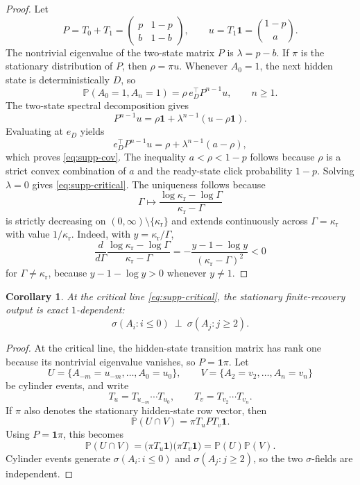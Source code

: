\documentclass[11pt]{amsart}
\numberwithin{equation}{section}
\newtheorem{corollary}[proposition]{Corollary}
\theoremstyle{remark}
\newcommand{\PP}{\mathbb{P}}
\begin{document}
\begin{proof}
Let
\[
P=T_0+T_1=
\begin{pmatrix}
 p & 1-p\\
 b & 1-b
\end{pmatrix},
\qquad
u=T_1\mathbf 1=\binom{1-p}{a}.
\]
The nontrivial eigenvalue of the two-state matrix $P$ is $\lambda=p-b$. If $\pi$ is the stationary distribution of $P$, then $\rho=\pi u$. Whenever $A_0=1$, the next hidden state is deterministically $D$, so
\[
\PP(A_0=1,A_n=1)=\rho\, e_D^\top P^{n-1}u,\qquad n\ge1.
\]
The two-state spectral decomposition gives
\[
P^{n-1}u=\rho\mathbf 1+\lambda^{n-1}(u-\rho\mathbf 1).
\]
Evaluating at $e_D$ yields
\[
e_D^\top P^{n-1}u=\rho+\lambda^{n-1}(a-\rho),
\]
which proves \cref{eq:supp-cov}. The inequality $a<\rho<1-p$ follows because $\rho$ is a strict convex combination of $a$ and the ready-state click probability $1-p$. Solving $\lambda=0$ gives \cref{eq:supp-critical}. The uniqueness follows because
\[
\Gamma\longmapsto \frac{\log\kappa_{\mathrm r}-\log\Gamma}{\kappa_{\mathrm r}-\Gamma}
\]
is strictly decreasing on $(0,\infty)\setminus\{\kappa_{\mathrm r}\}$ and extends continuously across $\Gamma=\kappa_{\mathrm r}$ with value $1/\kappa_{\mathrm r}$. Indeed, with $y=\kappa_{\mathrm r}/\Gamma$,
\[
\frac{d}{d\Gamma}
\frac{\log\kappa_{\mathrm r}-\log\Gamma}{\kappa_{\mathrm r}-\Gamma}
=
-\frac{y-1-\log y}{(\kappa_{\mathrm r}-\Gamma)^2}<0
\]
for $\Gamma\neq\kappa_{\mathrm r}$, because $y-1-\log y>0$ whenever $y\neq1$.
\end{proof}

\begin{corollary}\label{cor:supp-1dep}
At the critical line \cref{eq:supp-critical}, the stationary finite-recovery output is exact $1$-dependent:
\[
\sigma(A_i:i\le0)\ \perp\ \sigma(A_j:j\ge2).
\]
\end{corollary}

\begin{proof}
At the critical line, the hidden-state transition matrix has rank one because its nontrivial eigenvalue vanishes, so $P=\mathbf 1\pi$. Let
\[
U=\{A_{-m}=u_{-m},\dots,A_0=u_0\},
\qquad
V=\{A_2=v_2,\dots,A_n=v_n\}
\]
be cylinder events, and write
\[
T_u=T_{u_{-m}}\cdots T_{u_0},
\qquad
T_v=T_{v_2}\cdots T_{v_n}.
\]
If $\pi$ also denotes the stationary hidden-state row vector, then
\[
\PP(U\cap V)=\pi T_uPT_v\mathbf 1.
\]
Using $P=\mathbf 1\pi$, this becomes
\[
\PP(U\cap V)=\bigl(\pi T_u\mathbf 1\bigr)\bigl(\pi T_v\mathbf 1\bigr)=\PP(U)\PP(V).
\]
Cylinder events generate $\sigma(A_i:i\le0)$ and $\sigma(A_j:j\ge2)$, so the two $\sigma$-fields are independent.
\end{proof}
\end{document}
